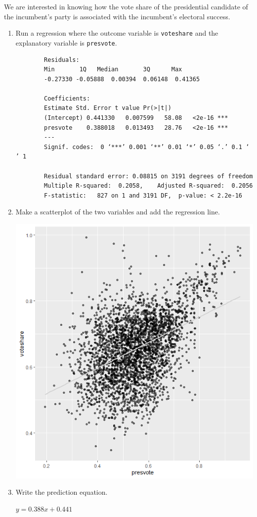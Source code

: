 \documentclass[12pt,letterpaper]{article}
\begin{document}
\noindent We are interested in knowing how the vote share of the presidential candidate of the incumbent's party is associated with the incumbent's electoral success.
	\vspace{.25cm}
	\begin{enumerate}
		\item Run a regression where the outcome variable is \texttt{voteshare} and the explanatory variable is \texttt{presvote}.
		
		
		\begin{verbatim}
		Residuals:
		Min       1Q   Median       3Q      Max 
		-0.27330 -0.05888  0.00394  0.06148  0.41365 
		
		Coefficients:
		Estimate Std. Error t value Pr(>|t|)    
		(Intercept) 0.441330   0.007599   58.08   <2e-16 ***
		presvote    0.388018   0.013493   28.76   <2e-16 ***
		---
		Signif. codes:  0 ‘***’ 0.001 ‘**’ 0.01 ‘*’ 0.05 ‘.’ 0.1 ‘ ’ 1
		
		Residual standard error: 0.08815 on 3191 degrees of freedom
		Multiple R-squared:  0.2058,	Adjusted R-squared:  0.2056 
		F-statistic:   827 on 1 and 3191 DF,  p-value: < 2.2e-16
		\end{verbatim}
			\vspace{3cm}
		\item Make a scatterplot of the two variables and add the regression line. 
		
		
			\includegraphics{Q3P1.png}
			\vspace{5cm}
		\item Write the prediction equation.
		
		$y=0.388x+0.441$
	\end{enumerate}
	
\end{document}
